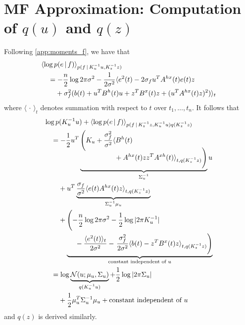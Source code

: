 \documentclass{article}
\newcommand{\id}[1]{\, \mathrm{d} #1}     %
\newcommand{\cond}{\, | \,}               %
\renewcommand{\ll}{\left}
\newcommand{\rr}{\right}
\newcommand{\la}{\langle}
\newcommand{\ra}{\rangle}
\newcommand{\phan}[1]{\hphantom{#1\;}}
\begin{document}

\section{MF Approximation: Computation of $q(u)$ and $q(z)$}
\label{app:computation_quqz}
Following \cref{app:moments_f}, we have that
\begin{align*}
    &\la \log p(e\cond f) \ra_{p(f\cond K_u^{-1} u, K_z^{-1} z)} \\
    &\quad= -\frac{n}{2}\log 2 \pi \sigma^2 - \frac{1}{2 \sigma^2} \la e^{2}(t) - 2 \sigma_f u^T A^{hx}(t) e(t) z\\
    &\quad\phan{=}  + \sigma_f^2 ( b(t) + u^T B^{h}(t) u+ z^T B^{x}(t) z + (u^T A^{hx}(t) z)^2 ) \ra_t
\end{align*}
where $\la\,\cdot\,\ra_t$ denotes summation with respect to $t$ over $t_1,\ldots,t_n$.
It follows that
\begin{align*}
    &\log p(K_u^{-1} u)  + \la \log p(e\cond f) \ra_{p(f\cond K_z^{-1}z, K_u^{-1}u)q(K_z^{-1}z)} \\
    &\quad= -\frac{1}{2}u^T\ll(K_u + \frac{\sigma_f^2}{\sigma^2} \la B^{h}(t) \rr.\\[-3\jot]
    &\quad\phan{= -\frac{1}{2}u^T}
        \underbrace{
            \phan{\ll(K_u + \frac{\sigma_f^2}{\sigma^2} \la \rr. } \!\!\!\!\!
            \ll. \vphantom{\frac{\sigma_f^2}{\sigma^2} }
                 + A^{hx}(t)  z z^T A^{xh}(t) \ra_{t,q(K_z^{-1} z)}
            \rr)
        }_{\Sigma_u^{-1}}u \\
    &\quad\phan{=}+ u^T \underbrace{\frac{\sigma_f}{\sigma^2}\la e(t) A^{hx}(t) z\ra_{t,q(K_z^{-1}z)}}_{\Sigma_u^{-1} \mu_u} \\
    &\quad\phan{=}  + \ll(\vphantom{\frac{\sigma_f^2}{2 \sigma^2}} {-\frac{n}{2}}\log 2 \pi \sigma^2-\frac{1}{2}\log|2 \pi K_u^{-1}|  \rr. \\
    &\quad\phan{=+}\underbrace{\phan{ \ll(\vphantom{\frac{\sigma_f^2}{2 \sigma^2}}\rr.}- \frac{\la e^2(t)\ra_t}{2 \sigma^2} - \ll.\frac{\sigma_f^2}{2 \sigma^2}\la b(t) - z^T B^{x}(t) z\ra_{t,q(K_z^{-1}z)}\rr)}_{\text{constant independent of $u$}} \\
    &\quad= \log \underbrace{\mathcal{N}(u; \mu_u, \Sigma_u)}_{q(K_u^{-1}u)}+ \frac{1}{2}\log|2 \pi \Sigma_u| \\
    &\quad\phan{=}+ \frac{1}{2}\mu_u^T \Sigma_u^{-1}\mu_u  + \text{constant independent of $u$}
\end{align*}
and $q(z)$ is derived similarly.
\end{document}
